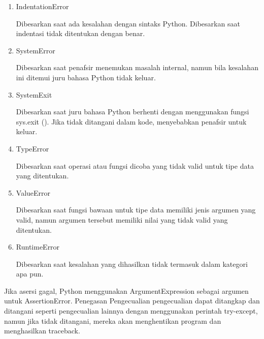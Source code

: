 \begin{enumerate}


\item IndentationError 

Dibesarkan saat ada kesalahan dengan sintaks Python. Dibesarkan saat indentasi tidak ditentukan dengan benar. 


\item SystemError  

Dibesarkan saat penafsir menemukan masalah internal, namun bila kesalahan ini ditemui juru bahasa Python tidak keluar. 
\vspace{12pt}




\item SystemExit  

Dibesarkan saat juru bahasa Python berhenti dengan menggunakan fungsi sys.exit (). Jika tidak ditangani dalam kode, menyebabkan penafsir untuk keluar. 
\vspace{12pt}


\item TypeError 

Dibesarkan saat operasi atau fungsi dicoba yang tidak valid untuk tipe data yang ditentukan. 
\vspace{12pt}


\item ValueError 

Dibesarkan saat fungsi bawaan untuk tipe data memiliki jenis argumen yang valid, namun argumen tersebut memiliki nilai yang tidak valid yang ditentukan. 
\vspace{12pt}

\item RuntimeError 

Dibesarkan saat kesalahan yang dihasilkan tidak termasuk dalam kategori apa pun. 
\vspace{12pt}

 \end {enumerate}

 \hspace*{0.5in} Jika asersi gagal, Python menggunakan ArgumentExpression sebagai argumen untuk AssertionError. Penegasan Pengecualian pengecualian dapat ditangkap dan ditangani seperti pengecualian lainnya dengan menggunakan perintah try-except, namun jika tidak ditangani, mereka akan menghentikan program dan menghasilkan traceback. 
 
